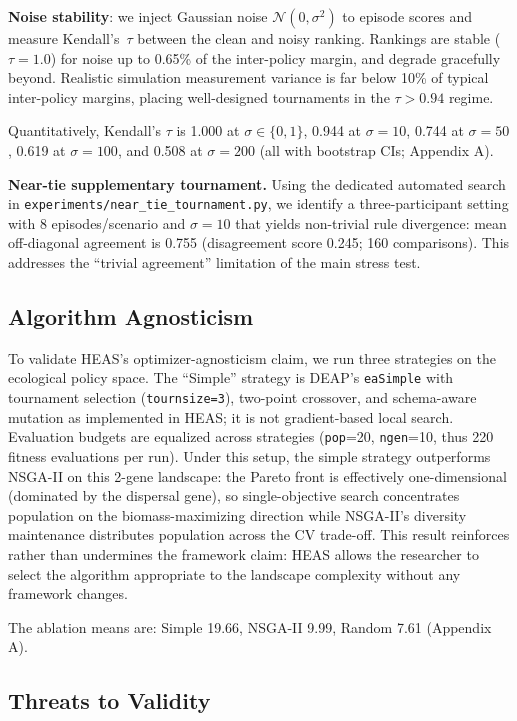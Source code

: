 \documentclass{wscpaperproc}
\begin{document}
\textbf{Noise stability}: we inject Gaussian noise
$\mathcal{N}(0,\sigma^2)$ to episode scores and measure Kendall's~$\tau$
between the clean and noisy ranking. Rankings are stable ($\tau\!=\!1.0$) for
noise up to 0.65\% of the inter-policy margin, and degrade gracefully beyond.
Realistic simulation measurement variance is far below 10\% of typical
inter-policy margins, placing well-designed tournaments in the
$\tau\!>\!0.94$ regime.

Quantitatively, Kendall's $\tau$ is 1.000 at $\sigma\in\{0,1\}$, 0.944 at
$\sigma=10$, 0.744 at $\sigma=50$, 0.619 at $\sigma=100$, and 0.508 at
$\sigma=200$ (all with bootstrap CIs; Appendix A).

\textbf{Near-tie supplementary tournament.} Using the dedicated automated
search in \texttt{experiments/near\_tie\_tournament.py}, we identify a
three-participant setting with 8 episodes/scenario and $\sigma=10$ that yields
non-trivial rule divergence: mean off-diagonal agreement is 0.755
(disagreement score 0.245; 160 comparisons). This addresses the ``trivial
agreement'' limitation of the main stress test.

\subsection{Algorithm Agnosticism}
\label{sec:ablation}

To validate HEAS's optimizer-agnosticism claim, we run three strategies on the
ecological policy space. The ``Simple'' strategy is
DEAP's \texttt{eaSimple} with tournament selection (\texttt{tournsize=3}),
two-point crossover, and schema-aware mutation as implemented in HEAS; it is
not gradient-based local search. Evaluation budgets are equalized across
strategies (\texttt{pop}=20, \texttt{ngen}=10, thus 220 fitness evaluations per
run). Under this setup, the simple strategy outperforms NSGA-II on this
2-gene landscape: the Pareto front is effectively
one-dimensional (dominated by the dispersal gene), so single-objective search
concentrates population on the biomass-maximizing direction while NSGA-II's
diversity maintenance distributes population across the CV trade-off. This
result reinforces rather than undermines the framework claim: HEAS allows the
researcher to select the algorithm appropriate to the landscape complexity
without any framework changes.

The ablation means are: Simple 19.66, NSGA-II 9.99, Random 7.61 (Appendix A).

\subsection{Threats to Validity}
\end{document}
